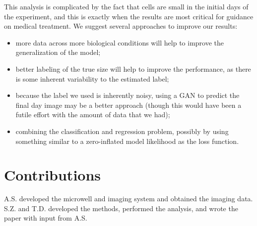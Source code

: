 \documentclass[10pt,twocolumn,letterpaper]{article}
\begin{document}
This analysis is complicated by the fact that cells are small in the initial days of the experiment, and this is exactly when the results are most critical for guidance on medical treatment.  We suggest several approaches to improve our results:
\begin{itemize}
\item more data across more biological conditions will help to improve the generalization of the model;
\item better labeling of the true size will help to improve the performance, as there is some inherent variability to the estimated label;
\item because the label we used is inherently noisy, using a GAN to predict the final day image may be a better approach (though this would have been a futile effort with the amount of data that we had);
\item combining the classification and regression problem, possibly by using something similar to a zero-inflated model likelihood as the loss function.
\end{itemize}







{\small


}

\section{Contributions}

A.S. developed the microwell and imaging system and obtained the imaging data.  S.Z. and T.D. developed the methods, performed the analysis, and wrote the paper with input from A.S.  
\end{document}
